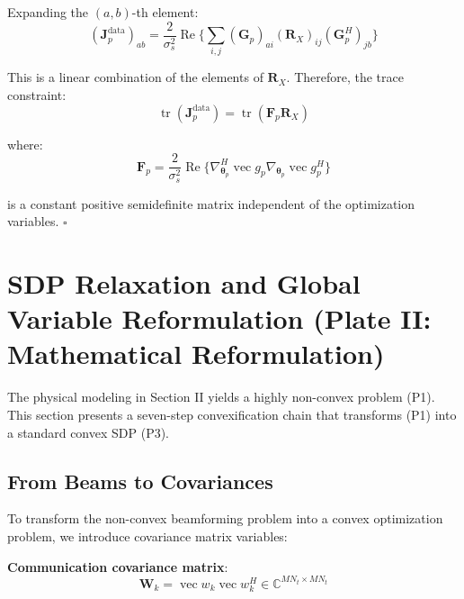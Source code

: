 \documentclass[12pt,a4paper]{article}
\DeclareMathOperator{\tr}{tr}
\DeclareMathOperator{\Real}{Re}
\DeclareMathOperator{\vect}{vec}
\newcommand{\mat}[1]{\mathbf{#1}}
\begin{document}
Expanding the $(a,b)$-th element:
\begin{equation}
(\mat{J}_p^{\text{data}})_{ab} = \frac{2}{\sigma_s^2} \Real\Big\{ \sum_{i,j} (\mat{G}_p)_{ai} (\mat{R}_X)_{ij} (\mat{G}_p^H)_{jb} \Big\}
\end{equation}

This is a linear combination of the elements of $\mat{R}_X$. Therefore, the trace constraint:
\begin{equation}
\tr(\mat{J}_p^{\text{data}}) = \tr(\mat{F}_p \mat{R}_X) \tag{12}
\end{equation}

where:
\begin{equation}
\mat{F}_p = \frac{2}{\sigma_s^2} \Real\Big\{ \nabla_{\boldsymbol{\theta}_p}^H \vect{g}_p \nabla_{\boldsymbol{\theta}_p} \vect{g}_p^H \Big\} \tag{13}
\end{equation}

is a constant positive semidefinite matrix independent of the optimization variables. \hfill$\square$

\section{SDP Relaxation and Global Variable Reformulation (Plate II: Mathematical Reformulation)}

The physical modeling in Section II yields a highly non-convex problem (P1). This section presents a seven-step convexification chain that transforms (P1) into a standard convex SDP (P3).



\subsection{From Beams to Covariances}

To transform the non-convex beamforming problem into a convex optimization problem, we introduce covariance matrix variables:

\textbf{Communication covariance matrix}:
\begin{equation}
\mat{W}_k = \vect{w}_k \vect{w}_k^H \in \mathbb{C}^{MN_t \times MN_t} \tag{15}
\end{equation}
\end{document}
